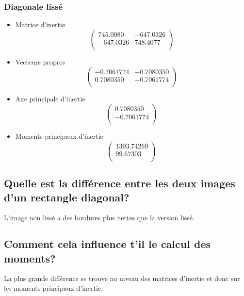 \documentclass[a4paper,12pt]{report}
\begin{document}
\subsubsection*{Diagonale lissé}
\begin{itemize}
\item Matrice d'inertie 
\[
   \left (
   \begin{array}{cc}
      745.0080 & -647.0326\\
      -647.0326 & 748.4077 \\
   \end{array}
   \right )
\]

\item Vecteurs propres
\[
   \left (
   \begin{array}{cc}
      -0.7061774 & -0.7080350  \\
      0.7080350 & -0.7061774 \\
   \end{array}
   \right )
\]

\item Axe principale d'inertie
\[
   \left (
   \begin{array}{c}
      0.7080350 \\
      -0.7061774 \\
   \end{array}
   \right )
\]

\item Moments principaux d'inertie
\[
   \left (
   \begin{array}{c}
      1393.74269 \\
      99.67303 \\
   \end{array}
   \right )
\]

\end{itemize}

\subsection*{Quelle est la différence entre les deux images d'un rectangle diagonal?}
L'image non lissé a des bordures plus nettes que la version lissé.

\subsection*{Comment cela influence t'il le calcul des moments?}
La plus grande différence se trouve au niveau des matrices d'inertie et donc sur les moments principaux d'inertie.
\end{document}
